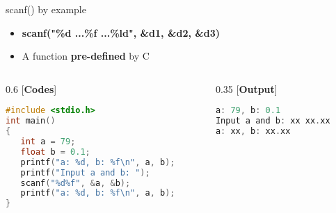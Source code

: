 \begin{frame}[fragile]{scanf() by example}
	\begin{itemize}
		\item {\textbf{scanf("\%d ...\%f ...\%ld", \&d1, \&d2, \&d3)}}
		\item {A function \textbf{pre-defined} by C}
	\end{itemize}
\begin{columns}	
\begin{column}{0.6\linewidth}
    [\textbf{Codes}]
	\begin{lstlisting}[numbers=none, language=c]
#include <stdio.h>
int main()
{
   int a = 79;
   float b = 0.1;
   printf("a: %d, b: %f\n", a, b);
   printf("Input a and b: ");
   scanf("%d%f", &a, &b);
   printf("a: %d, b: %f\n", a, b);
}
	\end{lstlisting}
\end{column}
\begin{column}{0.35\linewidth}
[\textbf{Output}]
	\begin{lstlisting}[numbers=none, language=c]
a: 79, b: 0.1
Input a and b: xx xx.xx
a: xx, b: xx.xx
	\end{lstlisting}
\end{column}
\end{columns}
\end{frame}